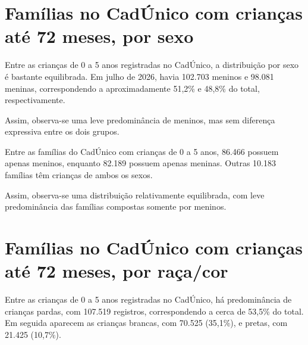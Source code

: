 
\section{Famílias no CadÚnico com crianças até 72 meses, por sexo}


Entre as crianças de 0 a 5 anos registradas no CadÚnico, a distribuição por sexo é bastante equilibrada. Em julho de 2026, havia 102.703 meninos e 98.081 meninas, correspondendo a aproximadamente 51,2\% e 48,8\% do total, respectivamente.

Assim, observa-se uma leve predominância de meninos, mas sem diferença expressiva entre os dois grupos.


Entre as famílias do CadÚnico com crianças de 0 a 5 anos, 86.466 possuem apenas meninos, enquanto 82.189 possuem apenas meninas. Outras 10.183 famílias têm crianças de ambos os sexos.

Assim, observa-se uma distribuição relativamente equilibrada, com leve predominância das famílias compostas somente por meninos.


\section{Famílias no CadÚnico com crianças até 72 meses, por raça/\allowbreak{}cor}


Entre as crianças de 0 a 5 anos registradas no CadÚnico, há predominância de crianças pardas, com 107.519 registros, correspondendo a cerca de 53,5\% do total. Em seguida aparecem as crianças brancas, com 70.525 (35,1\%), e pretas, com 21.425 (10,7\%).

